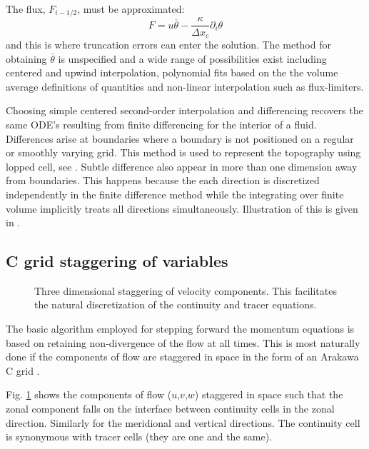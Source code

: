 The flux, $F_{i-1/2}$, must be approximated:
\begin{displaymath}
F = u \overline{\theta} - \frac{\kappa}{\Delta x_c} \partial_i \theta
\end{displaymath}
and this is where truncation errors can enter the solution. The
method for obtaining $\overline{\theta}$ is unspecified and a wide
range of possibilities exist including centered and upwind
interpolation, polynomial fits based on the the volume average
definitions of quantities and non-linear interpolation such as
flux-limiters.

Choosing simple centered second-order interpolation and differencing
recovers the same ODE's resulting from finite differencing for the
interior of a fluid. Differences arise at boundaries where a boundary
is not positioned on a regular or smoothly varying grid. This method
is used to represent the topography using lopped cell, see
\cite{adcroft:97}. Subtle difference also appear in more than one
dimension away from boundaries. This happens because the each
direction is discretized independently in the finite difference method
while the integrating over finite volume implicitly treats all
directions simultaneously. Illustration of this is given in
\cite{ac:02}.

\subsection{C grid staggering of variables}

\begin{figure}
\begin{center}
\end{center}
\caption{Three dimensional staggering of velocity components. This
facilitates the natural discretization of the continuity and tracer
equations. }
\label{fig:cgrid3d}
\end{figure}

The basic algorithm employed for stepping forward the momentum
equations is based on retaining non-divergence of the flow at all
times. This is most naturally done if the components of flow are
staggered in space in the form of an Arakawa C grid \cite{arakawa:77}.

Fig. \ref{fig:cgrid3d} shows the components of flow ($u$,$v$,$w$)
staggered in space such that the zonal component falls on the
interface between continuity cells in the zonal direction. Similarly
for the meridional and vertical directions.  The continuity cell is
synonymous with tracer cells (they are one and the same).



